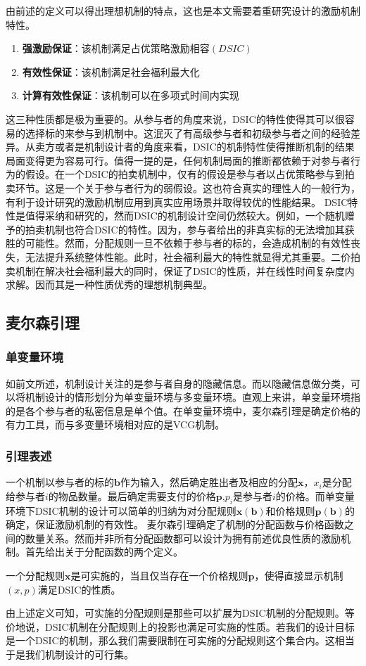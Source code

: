\documentclass[promaster]{thesis-uestc}
\begin{document}
由前述的定义可以得出理想机制的特点，这也是本文需要着重研究设计的激励机制特性。
\begin{enumerate}
    \item \textbf{强激励保证}：该机制满足占优策略激励相容$(DSIC)$
    \item  \textbf{有效性保证}：该机制满足社会福利最大化
    \item \textbf{计算有效性保证}：该机制可以在多项式时间内实现
\end{enumerate}
这三种性质都是极为重要的。从参与者的角度来说，DSIC的特性使得其可以很容易的选择标的来参与到机制中。这泯灭了有高级参与者和初级参与者之间的经验差异。从卖方或者是机制设计者的角度来看，DSIC的机制特性使得推断机制的结果局面变得更为容易可行。值得一提的是，任何机制局面的推断都依赖于对参与者行为的假设。在一个DSIC的拍卖机制中，仅有的假设是参与者以占优策略参与到拍卖环节。这是一个关于参与者行为的弱假设。这也符合真实的理性人的一般行为，有利于设计研究的激励机制应用到真实应用场景并取得较优的性能结果。
DSIC特性是值得采纳和研究的，然而DSIC的机制设计空间仍然较大。例如，一个随机赠予的拍卖机制也符合DSIC的特性。因为，参与者给出的非真实标的无法增加其获胜的可能性。然而，分配规则一旦不依赖于参与者的标的，会造成机制的有效性丧失，无法提升系统整体性能。此时，社会福利最大的特性就显得尤其重要。二价拍卖机制在解决社会福利最大的同时，保证了DSIC的性质，并在线性时间复杂度内求解。因而其是一种性质优秀的理想机制典型。

\subsection{麦尔森引理}
\subsubsection{单变量环境}
如前文所述，机制设计关注的是参与者自身的隐藏信息。而以隐藏信息做分类，可以将机制设计的情形划分为单变量环境与多变量环境。直观上来讲，单变量环境指的是各个参与者的私密信息是单个值。在单变量环境中，麦尔森引理是确定价格的有力工具，而与多变量环境相对应的是VCG机制。
\subsubsection{引理表述}
一个机制以参与者的标的$\mathbf{b}$作为输入，然后确定胜出者及相应的分配$\mathbf{x}$，$x_i$是分配给参与者$i$的物品数量。最后确定需要支付的价格$\mathbf{p}$,$p_i$是参与者$i$的价格。而单变量环境下DSIC机制的设计可以简单的归纳为对分配规则$\mathbf{x(b)}$和价格规则$\mathbf{p(b)}$的确定，保证激励机制的有效性。
麦尔森引理确定了机制的分配函数与价格函数之间的数量关系。然而并非所有分配函数都可以设计为拥有前述优良性质的激励机制。首先给出关于分配函数的两个定义。
\begin{definition}[可实施的分配规则]
一个分配规则$\mathbf{x}$是可实施的，当且仅当存在一个价格规则$\mathbf{p}$，使得直接显示机制$(x,p)$满足DSIC的性质。
\end{definition}
由上述定义可知，可实施的分配规则是那些可以扩展为DSIC机制的分配规则。等价地说，DSIC机制在分配规则上的投影也满足可实施的性质。若我们的设计目标是一个DSIC的机制，那么我们需要限制在可实施的分配规则这个集合内。这相当于是我们机制设计的可行集。
\end{document}
